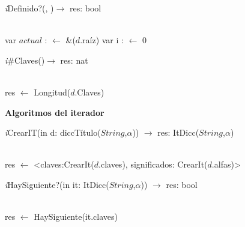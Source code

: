\begin{Algoritmos}

\textit{i}Definido?(, )$\longrightarrow$ res: bool \\
\hspace*{9mm}\\
\begin{algorithm}[H]
	var $actual$ :  $\leftarrow$ \&($d$.raíz) 
	var i :  $\leftarrow$ $0$ 

\end{algorithm}

\textit{i}$\#$Claves()$\longrightarrow$ res: nat\\
\hspace*{9mm}\\
\begin{algorithm}[H]
	res $\leftarrow$ Longitud($d$.Claves)
\end{algorithm}

\textbf {Algoritmos del iterador}

\textit{i}CrearIT(in d: diccTítulo($String$,$\alpha$)) $\longrightarrow$ res: ItDicc($String$,$\alpha$)\\
\hspace*{9mm}\\
\begin{algorithm}[H]
\BlankLine
res $\leftarrow$ <claves:CrearIt($d$.claves), significados: CrearIt($d$.alfas)>
\end{algorithm}

\textit{i}HaySiguiente?(in it: ItDicc($String$,$\alpha$)) $\longrightarrow$ res: bool\\
\hspace*{9mm}\\
\begin{algorithm}[H]
\BlankLine
res $\leftarrow$ HaySiguiente(it.claves)
\end{algorithm}


\end{Algoritmos}
